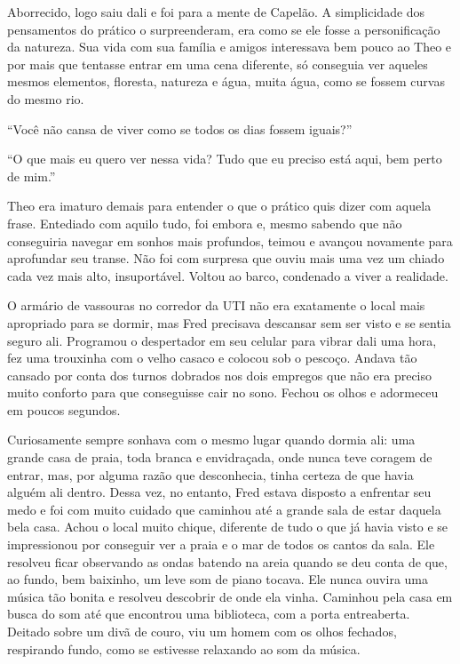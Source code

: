 Aborrecido, logo saiu dali e foi para a mente de Capelão. A simplicidade
dos pensamentos do prático o surpreenderam, era como se ele fosse a
personificação da natureza. Sua vida com sua família e amigos
interessava bem pouco ao Theo e por mais que tentasse entrar em uma cena
diferente, só conseguia ver aqueles mesmos elementos, floresta, natureza
e água, muita água, como se fossem curvas do mesmo rio.

``Você não cansa de viver como se todos os dias fossem iguais?''

``O que mais eu quero ver nessa vida? Tudo que eu preciso está aqui, bem
perto de mim.''

Theo era imaturo demais para entender o que o prático quis dizer com
aquela frase. Entediado com aquilo tudo, foi embora e, mesmo sabendo que
não conseguiria navegar em sonhos mais profundos, teimou e avançou
novamente para aprofundar seu transe. Não foi com surpresa que ouviu
mais uma vez um chiado cada vez mais alto, insuportável. Voltou ao
barco, condenado a viver a realidade.

\asterisc

O armário de vassouras no corredor da UTI não era exatamente o local
mais apropriado para se dormir, mas Fred precisava descansar sem ser
visto e se sentia seguro ali. Programou o despertador em seu celular
para vibrar dali uma hora, fez uma trouxinha com o velho casaco e
colocou sob o pescoço. Andava tão cansado por conta dos turnos dobrados
nos dois empregos que não era preciso muito conforto para que
conseguisse cair no sono. Fechou os olhos e adormeceu em poucos
segundos.

Curiosamente sempre sonhava com o mesmo lugar quando dormia ali: uma
grande casa de praia, toda branca e envidraçada, onde nunca teve coragem
de entrar, mas, por alguma razão que desconhecia, tinha certeza de que
havia alguém ali dentro. Dessa vez, no entanto, Fred estava disposto a
enfrentar seu medo e foi com muito cuidado que caminhou até a grande
sala de estar daquela bela casa. Achou o local muito chique, diferente
de tudo o que já havia visto e se impressionou por conseguir ver a praia
e o mar de todos os cantos da sala. Ele resolveu ficar observando as
ondas batendo na areia quando se deu conta de que, ao fundo, bem
baixinho, um leve som de piano tocava. Ele nunca ouvira uma música tão
bonita e resolveu descobrir de onde ela vinha. Caminhou pela casa em
busca do som até que encontrou uma biblioteca, com a porta entreaberta.
Deitado sobre um divã de couro, viu um homem com os olhos fechados,
respirando fundo, como se estivesse relaxando ao som da música.

